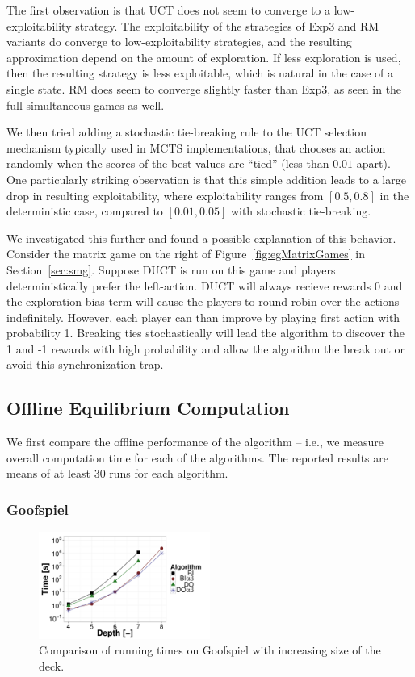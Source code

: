 The first observation is that UCT does not seem to converge to a low-exploitability strategy. The exploitability of the strategies of 
Exp3 and RM variants do converge to low-exploitability strategies, and the resulting approximation depend on the amount of exploration. 
If less exploration is used, then the resulting strategy is less exploitable, which is natural in the case of a single state. RM does seem to 
converge slightly faster than Exp3, as seen in the full simultaneous games as well. 

We then tried adding a stochastic tie-breaking rule to the UCT selection mechanism typically used in MCTS implementations, that chooses an 
action randomly when the scores of the best values are ``tied'' (less than $0.01$ apart).
One particularly striking observation is that this simple addition leads to a large drop in resulting exploitability, where exploitability
ranges from $[0.5,0.8]$ in the deterministic case, compared to $[0.01,0.05]$ with stochastic tie-breaking. 

We investigated this further and found a possible
explanation of this behavior. Consider the matrix game on the right of Figure~\ref{fig:egMatrixGames} in Section~\ref{sec:smg}.
Suppose DUCT is run on this game and players deterministically prefer the left-action. 
DUCT will always recieve rewards 0 and the exploration bias term will cause the players to round-robin over the actions indefinitely. 
However, each player can than improve by playing first action with probability 1. Breaking ties stochastically will lead the algorithm to 
discover the 1 and -1 rewards with high probability and allow the algorithm the break out or avoid this synchronization trap.

\subsection{Offline Equilibrium Computation}
We first compare the offline performance of the algorithm -- i.e., we measure overall computation time for each of the algorithms. 
The reported results are means of at least $30$ runs for each algorithm. 

\subsubsection{Goofspiel}
\begin{figure}
\centering
\includegraphics[width=0.5\textwidth]{figures/GS.pdf}
\caption{Comparison of running times on Goofspiel with increasing size of the deck.} \label{fig:off:res:gs}
\end{figure}

